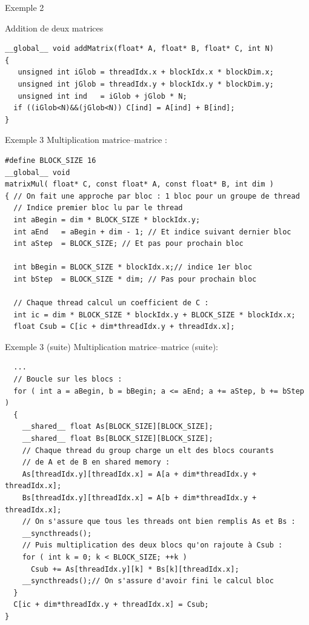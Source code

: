 \documentclass[handout,francais]{beamer}
\begin{document}
\begin{frame}[containsverbatim]{Exemple 2}

\begin{block}{Addition de deux matrices}
\begin{lstlisting}
__global__ void addMatrix(float* A, float* B, float* C, int N) 
{
   unsigned int iGlob = threadIdx.x + blockIdx.x * blockDim.x;
   unsigned int jGlob = threadIdx.y + blockIdx.y * blockDim.y;
   unsigned int ind   = iGlob + jGlob * N;
  if ((iGlob<N)&&(jGlob<N)) C[ind] = A[ind] + B[ind];
}
\end{lstlisting}
\end{block}
\end{frame}

\begin{frame}[fragile]{Exemple 3}
 Multiplication matrice--matrice :
\begin{lstlisting}
#define BLOCK_SIZE 16
__global__ void
matrixMul( float* C, const float* A, const float* B, int dim )
{ // On fait une approche par bloc : 1 bloc pour un groupe de thread
  // Indice premier bloc lu par le thread
  int aBegin = dim * BLOCK_SIZE * blockIdx.y;
  int aEnd   = aBegin + dim - 1; // Et indice suivant dernier bloc
  int aStep  = BLOCK_SIZE; // Et pas pour prochain bloc
  
  int bBegin = BLOCK_SIZE * blockIdx.x;// indice 1er bloc
  int bStep  = BLOCK_SIZE * dim; // Pas pour prochain bloc
  
  // Chaque thread calcul un coefficient de C :
  int ic = dim * BLOCK_SIZE * blockIdx.y + BLOCK_SIZE * blockIdx.x;
  float Csub = C[ic + dim*threadIdx.y + threadIdx.x];
\end{lstlisting}
\end{frame}

\begin{frame}[fragile]{Exemple 3 (suite)}
 Multiplication matrice--matrice (suite):
\begin{lstlisting}
  ...
  // Boucle sur les blocs :
  for ( int a = aBegin, b = bBegin; a <= aEnd; a += aStep, b += bStep ) 
  {
    __shared__ float As[BLOCK_SIZE][BLOCK_SIZE];
    __shared__ float Bs[BLOCK_SIZE][BLOCK_SIZE];
    // Chaque thread du group charge un elt des blocs courants
    // de A et de B en shared memory :
    As[threadIdx.y][threadIdx.x] = A[a + dim*threadIdx.y + threadIdx.x];
    Bs[threadIdx.y][threadIdx.x] = A[b + dim*threadIdx.y + threadIdx.x];
    // On s'assure que tous les threads ont bien remplis As et Bs :
    __syncthreads();
    // Puis multiplication des deux blocs qu'on rajoute à Csub :
    for ( int k = 0; k < BLOCK_SIZE; ++k )
      Csub += As[threadIdx.y][k] * Bs[k][threadIdx.x];
    __syncthreads();// On s'assure d'avoir fini le calcul bloc
  }
  C[ic + dim*threadIdx.y + threadIdx.x] = Csub;
}
\end{lstlisting}
\end{frame}
\end{document}
